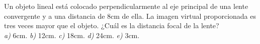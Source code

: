
Un objeto lineal está colocado perpendicularmente al eje principal de una lente convergente y a una distancia de 8cm de ella. La imagen virtual proporcionada es tres veces mayor que el objeto. ¿Cuál es la distancia focal de la lente?\\
\textit{a)} 6cm. \textit{b)} 12cm. \textit{c)} 18cm. \textit{d)} 24cm. \textit{e)} 3cm.
